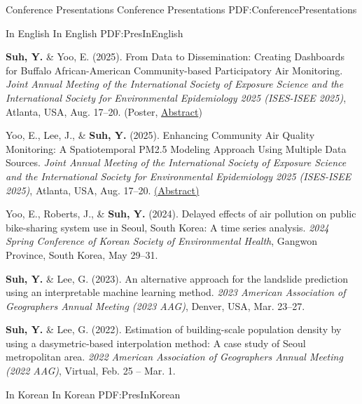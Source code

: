 \documentclass[letterpaper,MMMyyyy,nonstopmode]{simpleresumecv}
\begin{document}
\begin{Body}
\Section
{Conference Presentations}
{Conference Presentations}
{PDF:ConferencePresentations}

\SubSection
{In English}
{In English}
{PDF:PresInEnglish}

\BigGap

\NumberedItem{[5]}
\textbf{Suh, Y.} \& Yoo, E. (2025).
From Data to Dissemination: Creating Dashboards for Buffalo African-American Community-based Participatory Air Monitoring.
\textit{Joint Annual Meeting of the International Society of Exposure Science and the International Society for Environmental Epidemiology 2025 (ISES-ISEE 2025)}, Atlanta, USA, Aug. 17–20. \hfill (Poster, \href{https://eventclass.it/isesisee2025/scientific/external-program/session?s=P07#e2609}{Abstract})

\BigGap

\NumberedItem{[4]}
Yoo, E., Lee, J., \& \textbf{Suh, Y.} (2025).
Enhancing Community Air Quality Monitoring: A Spatiotemporal PM2.5 Modeling Approach Using Multiple Data Sources.
\textit{Joint Annual Meeting of the International Society of Exposure Science and the International Society for Environmental Epidemiology 2025 (ISES-ISEE 2025)}, Atlanta, USA, Aug. 17–20. \hfill\href{https://eventclass.it/isesisee2025/scientific/external-program/session?s=TO16#e477}{(Abstract)}

\BigGap

\NumberedItem{[3]}
Yoo, E., Roberts, J., \& \textbf{Suh, Y.} (2024).
Delayed effects of air pollution on public bike-sharing system use in Seoul, South Korea: A time series analysis.
\textit{2024 Spring Conference of Korean Society of Environmental Health}, Gangwon Province, South Korea, May 29–31.

\BigGap

\NumberedItem{[2]}
\textbf{Suh, Y.} \& Lee, G. (2023).
An alternative approach for the landslide prediction using an interpretable machine learning method.
\textit{2023 American Association of Geographers Annual Meeting (2023 AAG)}, Denver, USA, Mar. 23–27.

\BigGap

\NumberedItem{[1]}
\textbf{Suh, Y.} \& Lee, G. (2022).
Estimation of building-scale population density by using a dasymetric-based interpolation method: A case study of Seoul metropolitan area.
\textit{2022 American Association of Geographers Annual Meeting (2022 AAG)}, Virtual, Feb. 25 – Mar. 1.

\BigGap

\SubSection
{In Korean}
{In Korean}
{PDF:PresInKorean}


\end{Body}
\end{document}
